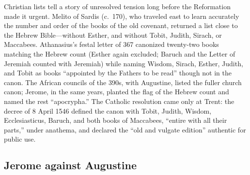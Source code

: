 Christian lists tell a story of unresolved tension long before the
Reformation made it urgent. Melito of Sardis (c.~170), who traveled east
to learn accurately the number and order of the books of the old covenant,
returned a list close to the Hebrew Bible---without Esther, and without
Tobit, Judith, Sirach, or Maccabees. Athanasius's festal letter of 367 canonized twenty-two books
matching the Hebrew count (Esther again excluded; Baruch and the Letter
of Jeremiah counted with Jeremiah) while naming Wisdom, Sirach, Esther,
Judith, and Tobit as books ``appointed by the Fathers to be read'' though
not in the canon. The African councils of the
390s, with Augustine, listed the fuller church canon; Jerome, in the
same years, planted the flag of the Hebrew count and named the rest
``apocrypha.'' The Catholic resolution came only at Trent: the decree of
8 April 1546 defined the canon with Tobit, Judith, Wisdom,
Ecclesiasticus, Baruch, and both books of Maccabees, ``entire with all
their parts,'' under anathema, and declared the ``old and vulgate
edition'' authentic for public use.

\subsection{Jerome against Augustine}


